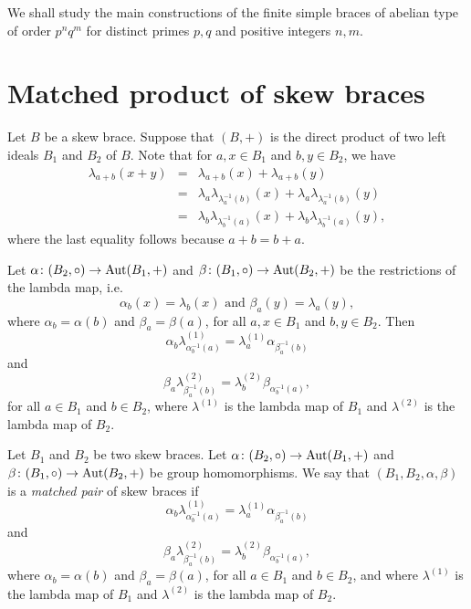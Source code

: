 We shall study the main constructions of the finite simple braces 
of abelian type of order $p^nq^m$ for distinct primes $p,q$ and positive integers $n,m$.
  
\section{Matched product of skew braces} 

Let $B$ be a skew brace. Suppose that $(B,+)$ is the direct product of two left ideals $B_1$ and $B_2$ of $B$.
Note that for $a,x\in B_1$ and $b,y\in B_2$, we have 
\begin{eqnarray*}
	\lambda_{a+b}(x+y)&=&\lambda_{a+b}(x)+\lambda_{a+b}(y)\\
	&=&\lambda_{a}\lambda_{\lambda^{-1}_{a}(b)}(x)+\lambda_{a}\lambda_{\lambda^{-1}_{a}(b)}(y)\\
	&=&\lambda_{b}\lambda_{\lambda^{-1}_{b}(a)}(x)+\lambda_{b}\lambda_{\lambda^{-1}_{b}(a)}(y),
\end{eqnarray*}	
where the last equality follows because $a+b=b+a$.

Let $\alpha\colon (B_2,\circ)\rightarrow\operatorname{Aut}(B_1,+)$ and $\beta\colon (B_1,\circ)\rightarrow\operatorname{Aut}(B_2,+)$ be the restrictions of the lambda map, i.e. 
$$\alpha_b(x)=\lambda_b(x)\mbox{ and }\beta_a(y)=\lambda_a(y),$$
where $\alpha_b=\alpha(b)$ and $\beta_a=\beta(a)$, for all $a,x\in B_1$ and $b,y\in B_2$. Then
$$\alpha_b\lambda^{(1)}_{\alpha^{-1}_b(a)}=\lambda^{(1)}_a\alpha_{\beta^{-1}_a(b)}$$
and	
$$\beta_a\lambda^{(2)}_{\beta^{-1}_a(b)}=\lambda^{(2)}_b\beta_{\alpha^{-1}_b(a)},$$
for all $a\in B_1$ and $b\in B_2$, where $\lambda^{(1)}$ is the lambda map of $B_1$ and $\lambda^{(2)}$ is the lambda map of $B_2$.

\begin{definition}\label{def:matchedpair}
	Let $B_1$ and $B_2$ be two skew braces. Let $\alpha\colon (B_2,\circ)\rightarrow \operatorname{Aut}(B_1,+)$ and $\beta\colon (B_1,\circ)\rightarrow \operatorname{Aut}(B_2,+)$ be group homomorphisms. We say that $(B_1,B_2,\alpha,\beta)$ is a \emph{matched pair} of skew braces if
	$$\alpha_b\lambda^{(1)}_{\alpha^{-1}_b(a)}=\lambda^{(1)}_a\alpha_{\beta^{-1}_a(b)}$$
	and	
	$$\beta_a\lambda^{(2)}_{\beta^{-1}_a(b)}=\lambda^{(2)}_b\beta_{\alpha^{-1}_b(a)},$$
	where $\alpha_b=\alpha(b)$ and $\beta_a=\beta(a)$, for all $a\in B_1$ and $b\in B_2$, and where $\lambda^{(1)}$ is the lambda map of $B_1$ and $\lambda^{(2)}$ is the lambda map of $B_2$.	
\end{definition}

